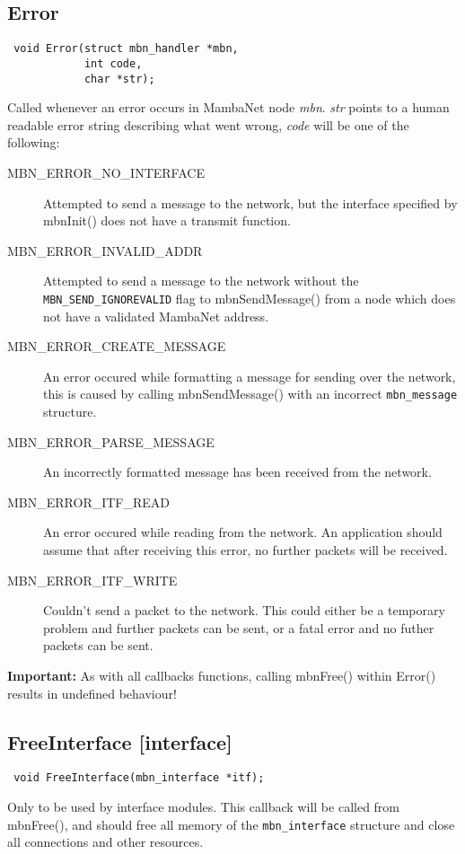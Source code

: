 \documentclass[a4paper]{report}
\begin{document}
\subsection{Error}
\begin{verbatim}
 void Error(struct mbn_handler *mbn,
            int code,
            char *str);
\end{verbatim}
Called whenever an error occurs in MambaNet node \textit{mbn}. \textit{str} points to a human readable error string describing what went wrong, \textit{code} will be one of the following:
\begin{description}
 \item[MBN\_ERROR\_NO\_INTERFACE]
  Attempted to send a message to the network, but the interface specified by mbnInit() does not have a transmit function.
 \item[MBN\_ERROR\_INVALID\_ADDR]
  Attempted to send a message to the network without the  \verb|MBN_SEND_IGNOREVALID| flag to mbnSendMessage() from a node which does not have a validated MambaNet address.
 \item[MBN\_ERROR\_CREATE\_MESSAGE]
  An error occured while formatting a message for sending over the network, this is caused by calling mbnSendMessage() with an incorrect \verb|mbn_message| structure.
 \item[MBN\_ERROR\_PARSE\_MESSAGE]
  An incorrectly formatted message has been received from the network.
 \item[MBN\_ERROR\_ITF\_READ]
  An error occured while reading from the network. An application should assume that after receiving this error, no further packets will be received.
 \item[MBN\_ERROR\_ITF\_WRITE]
  Couldn't send a packet to the network. This could either be a temporary problem and further packets can be sent, or a fatal error and no futher packets can be sent.
\end{description}

\textbf{Important:} As with all callbacks functions, calling mbnFree() within Error() results in undefined behaviour!


\subsection{FreeInterface \footnotesize{[interface]}}
\begin{verbatim}
 void FreeInterface(mbn_interface *itf);
\end{verbatim}
Only to be used by interface modules. This callback will be called from mbnFree(), and should free all memory of the \verb|mbn_interface| structure and close all connections and other resources.
\end{document}
